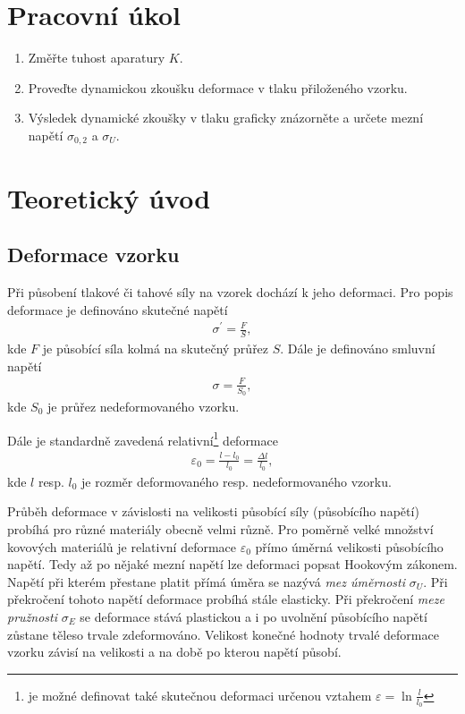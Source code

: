\documentclass[a4paper,12pt]{article}
\begin{document}


\section{Pracovní úkol}
\begin{enumerate}
\item Změřte tuhost aparatury $K$.
\item Proveďte dynamickou zkoušku deformace v tlaku přiloženého vzorku.
\item Výsledek dynamické zkoušky v tlaku graficky znázorněte a určete 
mezní napětí $\sigma_{0,2}$ a $\sigma_{U}$. 
\end{enumerate}


\section{Teoretický úvod}

\subsection{Deformace vzorku}
Při působení tlakové či tahové síly na vzorek dochází k jeho deformaci. 
Pro popis deformace je definováno skutečné napětí 
\begin{eqnarray} 
\nonumber \sigma^{'} = \frac{F}{S},
\end{eqnarray}
kde $F$ je působící síla kolmá na skutečný průřez $S$. Dále je definováno 
smluvní napětí
\begin{eqnarray} 
\sigma = \frac{F}{S_0}, \label{napeti}
\end{eqnarray}
kde $S_0$ je průřez nedeformovaného vzorku.

Dále je standardně zavedená relativní\footnote{je možné definovat také 
skutečnou deformaci určenou vztahem $\varepsilon = \ln{\frac{l}{l_0}}$} 
deformace
\begin{eqnarray}
\varepsilon_0 = \frac{l-l_0}{l_0} = \frac{\Delta l}{l_0}, \label{reldef}
\end{eqnarray}
kde $l$ resp. $l_0$ je rozměr deformovaného resp. nedeformovaného vzorku.

Průběh deformace v závislosti na velikosti působící síly (působícího napětí) 
probíhá pro různé materiály obecně velmi různě. Pro poměrně velké 
množství kovových materiálů je relativní deformace $\varepsilon_0$ přímo 
úměrná velikosti působícího napětí. Tedy až po nějaké mezní napětí lze 
deformaci popsat Hookovým zákonem. Napětí při kterém přestane platit 
přímá úměra se nazývá \textit{mez úměrnosti} $\sigma_{U}$. Při překročení 
tohoto napětí deformace probíhá stále elasticky. Při překročení \textit{meze pružnosti} 
$\sigma_E$ se deformace stává plastickou a i po uvolnění působícího napětí 
zůstane těleso trvale zdeformováno. Velikost konečné hodnoty trvalé deformace 
vzorku závisí na velikosti a na době po kterou napětí působí. 
\end{document}
